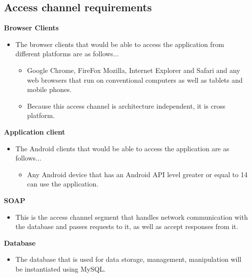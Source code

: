 \documentclass[10pt,a4paper]{article}
\begin{document}
\subsection{Access channel requirements}
\indent\indent \textbf{Browser Clients}
\begin{itemize}
\item The browser clients that would be able to access the application from different platforms are as follows...
\begin{itemize}
\item Google Chrome, FireFox Mozilla, Internet Explorer and Safari and any web browsers that run on conventional computers as well as tablets and mobile phones.
\item Because this access channel is architecture independent, it is cross platform.                                                               
\end{itemize}
\end{itemize}
\indent\indent \textbf{Application client}
\begin{itemize}
\item The Android clients that would be able to access the application are as follows...
\begin{itemize}
\item Any Android device that has an Android API level greater or equal to 14 can use the application.
\end{itemize}
\end{itemize}                                
\indent\indent \textbf{SOAP}
\begin{itemize}
\item This is the access channel segment that handles network communication with the database and passes requests to it, as well as accept responses from it.
\end{itemize}                                                                
\indent\indent\textbf{Database}
\begin{itemize}
\item The database that is used for data storage, management, manipulation will be instantiated using MySQL.
\end{itemize}                                                                                                
\end{document}
